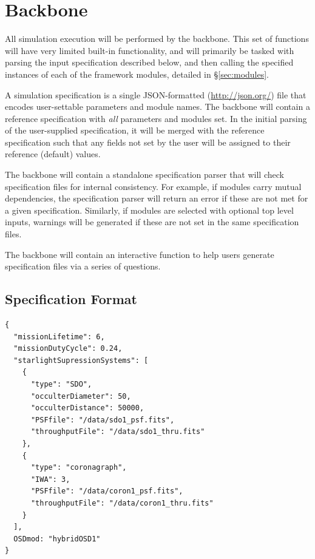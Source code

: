 \documentclass[cleanfoot]{asme2ej}
\begin{document}

\section{Backbone}
All simulation execution will be performed by the backbone.  This set of functions will have very limited built-in functionality, and will primarily be tasked with parsing the input specification described below, and then calling the specified instances of each of the framework modules, detailed in \S\ref{sec:modules}.

A simulation specification is a single JSON-formatted (\url{http://json.org/}) file that encodes user-settable parameters and module names.  The backbone will contain a reference specification with \emph{all} parameters and modules set.  In the initial parsing of the user-supplied specification, it will be merged with the reference specification such that any fields not set by the user will be assigned to their reference (default) values. 

The backbone will contain a standalone specification parser that will check specification files for internal consistency.  For example, if modules carry mutual dependencies, the specification parser will return an error if these are not met for a given specification.  Similarly, if modules are selected with optional top level inputs, warnings will be generated if these are not set in the same specification files.

The backbone will contain an interactive function to help users generate specification files via a series of questions.

\subsection{Specification Format}
\begin{verbatim}
{
  "missionLifetime": 6,
  "missionDutyCycle": 0.24,
  "starlightSupressionSystems": [
    {
      "type": "SDO",
      "occulterDiameter": 50,
      "occulterDistance": 50000,
      "PSFfile": "/data/sdo1_psf.fits",
      "throughputFile": "/data/sdo1_thru.fits"
    },
    {
      "type": "coronagraph",
      "IWA": 3,
      "PSFfile": "/data/coron1_psf.fits",
      "throughputFile": "/data/coron1_thru.fits"
    }
  ],
  OSDmod: "hybridOSD1"
}
\end{verbatim}
\end{document}

